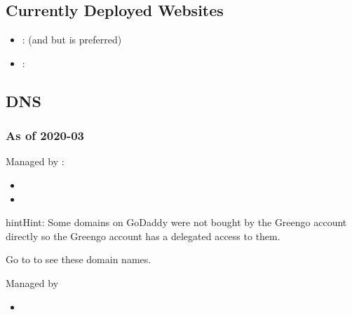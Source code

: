 \documentclass[letterpaper,10pt,english]{sphinxmanual}
\begin{document}
\subsection{Currently Deployed Websites}
\label{\detokenize{websites/greengo_websites:currently-deployed-websites}}\begin{itemize}
\item {} 
:  (and  but  is preferred)

\item {} 
: 

\end{itemize}


\subsection{DNS}
\label{\detokenize{websites/greengo_websites:dns}}

\subsubsection{As of 2020-03}
\label{\detokenize{websites/greengo_websites:as-of-2020-03}}
Managed by :
\begin{itemize}
\item {} 

\item {} 

\end{itemize}

\begin{sphinxadmonition}{hint}{Hint:}
Some domains on GoDaddy were not bought by the Greengo account directly so the Greengo account has a delegated access to them.

Go to  to see these domain names.
\end{sphinxadmonition}

Managed by 
\begin{itemize}
\item {} 

\end{itemize}
\end{document}
